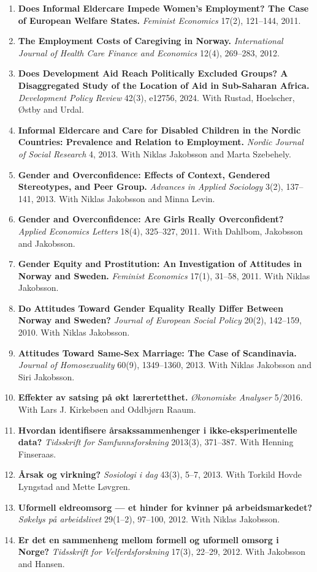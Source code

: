 \documentclass[11pt]{article}
\newcommand{\pub}[2]{\item \textbf{#1} #2}
\begin{document}
\begin{enumerate}
\pub{Does Informal Eldercare Impede Women's Employment? The Case of European Welfare States.}{\textit{Feminist Economics} 17(2), 121--144, 2011.}
\pub{The Employment Costs of Caregiving in Norway.}{\textit{International Journal of Health Care Finance and Economics} 12(4), 269--283, 2012.}
\pub{Does Development Aid Reach Politically Excluded Groups? A Disaggregated Study of the Location of Aid in Sub-Saharan Africa.}{\textit{Development Policy Review} 42(3), e12756, 2024. With Rustad, Hoelscher, Østby and Urdal.}
\pub{Informal Eldercare and Care for Disabled Children in the Nordic Countries: Prevalence and Relation to Employment.}{\textit{Nordic Journal of Social Research} 4, 2013. With Niklas Jakobsson and Marta Szebehely.}
\pub{Gender and Overconfidence: Effects of Context, Gendered Stereotypes, and Peer Group.}{\textit{Advances in Applied Sociology} 3(2), 137--141, 2013. With Niklas Jakobsson and Minna Levin.}
\pub{Gender and Overconfidence: Are Girls Really Overconfident?}{\textit{Applied Economics Letters} 18(4), 325--327, 2011. With Dahlbom, Jakobsson and Jakobsson.}
\pub{Gender Equity and Prostitution: An Investigation of Attitudes in Norway and Sweden.}{\textit{Feminist Economics} 17(1), 31--58, 2011. With Niklas Jakobsson.}
\pub{Do Attitudes Toward Gender Equality Really Differ Between Norway and Sweden?}{\textit{Journal of European Social Policy} 20(2), 142--159, 2010. With Niklas Jakobsson.}
\pub{Attitudes Toward Same-Sex Marriage: The Case of Scandinavia.}{\textit{Journal of Homosexuality} 60(9), 1349--1360, 2013. With Niklas Jakobsson and Siri Jakobsson.}
\pub{Effekter av satsing på økt lærertetthet.}{\textit{Økonomiske Analyser} 5/2016. With Lars J. Kirkebøen and Oddbjørn Raaum.}
\pub{Hvordan identifisere årsakssammenhenger i ikke-eksperimentelle data?}{\textit{Tidsskrift for Samfunnsforskning} 2013(3), 371--387. With Henning Finseraas.}
\pub{Årsak og virkning?}{\textit{Sosiologi i dag} 43(3), 5--7, 2013. With Torkild Hovde Lyngstad and Mette Løvgren.}
\pub{Uformell eldreomsorg --- et hinder for kvinner på arbeidsmarkedet?}{\textit{Søkelys på arbeidslivet} 29(1--2), 97--100, 2012. With Niklas Jakobsson.}
\pub{Er det en sammenheng mellom formell og uformell omsorg i Norge?}{\textit{Tidsskrift for Velferdsforskning} 17(3), 22--29, 2012. With Jakobsson and Hansen.}
\end{enumerate}

\end{document}
